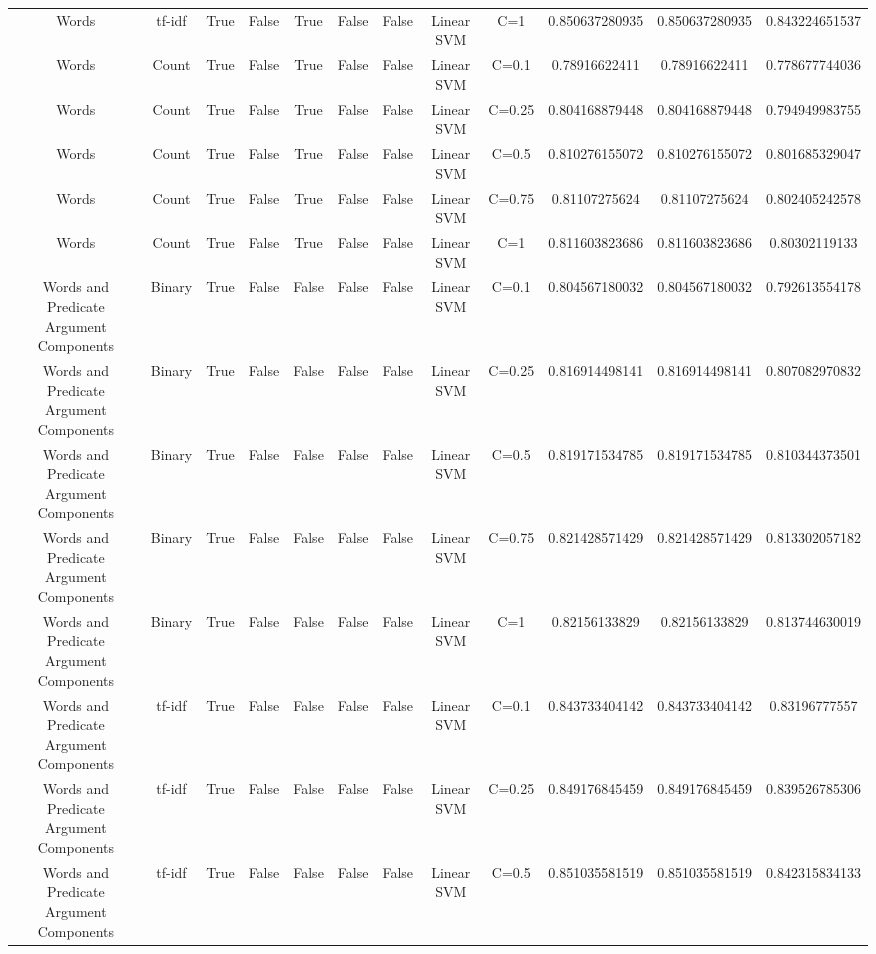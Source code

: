 \documentclass[11pt]{article}
\begin{document}
\begin{tabular}{|c|c|c|c|c|c|c|c|c|c|c|c|}
Words & tf-idf & True & False & True & False & False & Linear SVM & C=1 & 0.850637280935 & 0.850637280935 & 0.843224651537 \\ 
Words & Count & True & False & True & False & False & Linear SVM & C=0.1 & 0.78916622411 & 0.78916622411 & 0.778677744036 \\ 
Words & Count & True & False & True & False & False & Linear SVM & C=0.25 & 0.804168879448 & 0.804168879448 & 0.794949983755 \\ 
Words & Count & True & False & True & False & False & Linear SVM & C=0.5 & 0.810276155072 & 0.810276155072 & 0.801685329047 \\ 
Words & Count & True & False & True & False & False & Linear SVM & C=0.75 & 0.81107275624 & 0.81107275624 & 0.802405242578 \\ 
Words & Count & True & False & True & False & False & Linear SVM & C=1 & 0.811603823686 & 0.811603823686 & 0.80302119133 \\ 
Words and Predicate Argument Components & Binary & True & False & False & False & False & Linear SVM & C=0.1 & 0.804567180032 & 0.804567180032 & 0.792613554178 \\ 
Words and Predicate Argument Components & Binary & True & False & False & False & False & Linear SVM & C=0.25 & 0.816914498141 & 0.816914498141 & 0.807082970832 \\ 
Words and Predicate Argument Components & Binary & True & False & False & False & False & Linear SVM & C=0.5 & 0.819171534785 & 0.819171534785 & 0.810344373501 \\ 
Words and Predicate Argument Components & Binary & True & False & False & False & False & Linear SVM & C=0.75 & 0.821428571429 & 0.821428571429 & 0.813302057182 \\ 
Words and Predicate Argument Components & Binary & True & False & False & False & False & Linear SVM & C=1 & 0.82156133829 & 0.82156133829 & 0.813744630019 \\ 
Words and Predicate Argument Components & tf-idf & True & False & False & False & False & Linear SVM & C=0.1 & 0.843733404142 & 0.843733404142 & 0.83196777557 \\ 
Words and Predicate Argument Components & tf-idf & True & False & False & False & False & Linear SVM & C=0.25 & 0.849176845459 & 0.849176845459 & 0.839526785306 \\ 
Words and Predicate Argument Components & tf-idf & True & False & False & False & False & Linear SVM & C=0.5 & 0.851035581519 & 0.851035581519 & 0.842315834133 \\ 

\end{tabular}
\end{document}
